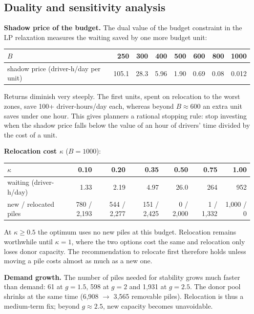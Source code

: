 \documentclass[11pt,a4paper]{article}
\begin{document}
\subsection{Duality and sensitivity analysis}
\textbf{Shadow price of the budget.} The dual value of the budget constraint in the LP relaxation measures the waiting saved by one more budget unit:
\begin{center}\small
\begin{tabular}{@{}lrrrrrrr@{}}\toprule
$B$ & 250 & 300 & 400 & 500 & 600 & 800 & 1000\\\midrule
shadow price (driver-h/day per unit) & 105.1 & 28.3 & 5.96 & 1.90 & 0.69 & 0.08 & 0.012\\\bottomrule
\end{tabular}\end{center}
Returns diminish very steeply. The first units, spent on relocation to the worst zones, save 100+ driver-hours/day each, whereas beyond $B \approx 600$ an extra unit saves under one hour. This gives planners a rational stopping rule: stop investing when the shadow price falls below the value of an hour of drivers' time divided by the cost of a unit.

\textbf{Relocation cost $\kappa$} ($B = 1000$):
\begin{center}\small
\begin{tabular}{@{}lrrrrrr@{}}\toprule
$\kappa$ & 0.10 & 0.20 & 0.35 & 0.50 & 0.75 & 1.00\\\midrule
waiting (driver-h/day) & 1.33 & 2.19 & 4.97 & 26.0 & 264 & 952\\
new / relocated piles & 780 / 2{,}193 & 544 / 2{,}277 & 151 / 2{,}425 & 0 / 2{,}000 & 1 / 1{,}332 & 1{,}000 / 0\\\bottomrule
\end{tabular}\end{center}
At $\kappa \ge 0.5$ the optimum uses no new piles at this budget. Relocation remains worthwhile until $\kappa = 1$, where the two options cost the same and relocation only loses donor capacity. The recommendation to relocate first therefore holds unless moving a pile costs almost as much as a new one.

\textbf{Demand growth.} The number of piles needed for stability grows much faster than demand: 61 at $g = 1.5$, 598 at $g = 2$ and 1{,}931 at $g = 2.5$. The donor pool shrinks at the same time (6{,}908 $\to$ 3{,}565 removable piles). Relocation is thus a medium-term fix; beyond $g \approx 2.5$, new capacity becomes unavoidable.
\end{document}
